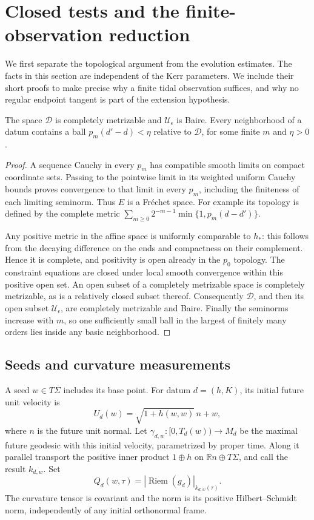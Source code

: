 \section{Closed tests and the finite-observation reduction}\label{sec:category}

We first separate the topological argument from the evolution estimates.
The facts in this section are independent of the Kerr parameters. We
include their short proofs to make precise why a finite tidal
observation suffices, and why no regular endpoint tangent is part of
the extension hypothesis.

\begin{lemma}\label{cat:baire}
The space \(\mathcal D\) is completely metrizable and
\(\mathcal U_\epsilon\) is Baire. Every neighborhood of a datum contains
a ball \(p_m(d'-d)<\eta\) relative to \(\mathcal D\), for some finite
\(m\) and \(\eta>0\).
\end{lemma}
\begin{proof}
A sequence Cauchy in every \(p_m\) has compatible smooth limits on
compact coordinate sets. Passing to the pointwise limit in its weighted
uniform Cauchy bounds proves convergence to that limit in every
\(p_m\), including the finiteness of each limiting seminorm. Thus
\(E\) is a Fr\'echet space. For example its topology is defined by
the complete metric
\(\sum_{m\geq0}2^{-m-1}\min\{1,p_m(d-d')\}\).

Any positive metric in the affine space is uniformly comparable to
\(h_*\): this follows from the decaying difference on the ends and
compactness on their complement. Hence it is complete, and positivity
is open already in the \(p_0\) topology. The constraint equations are
closed under local smooth convergence within this positive open set.
An open subset of a completely metrizable space is completely
metrizable, as is a relatively closed subset thereof. Consequently
\(\mathcal D\), and then its open subset \(\mathcal U_\epsilon\),
are completely metrizable and Baire. Finally the seminorms increase
with \(m\), so one sufficiently small ball in the largest of finitely
many orders lies inside any basic neighborhood.
\end{proof}

\subsection{Seeds and curvature measurements}

A seed \(w\in T\Sigma\) includes its base point. For datum
\(d=(h,K)\), its initial future unit velocity is
\[
 U_d(w)=\sqrt{1+h(w,w)}\,n+w,
\]
where \(n\) is the future unit normal. Let
\(\gamma_{d,w}:[0,T_d(w))\to M_d\) be the maximal future geodesic
with this initial velocity, parametrized by proper time. Along it
parallel transport the positive inner product \(1\oplus h\) on
\(\mathbb R n\oplus T\Sigma\), and call the result \(k_{d,w}\).
Set
\begin{equation}\label{cat:Q}
 Q_d(w,\tau)=|\operatorname{Riem}(g_d)|_{k_{d,w}(\tau)}.
\end{equation}
The curvature tensor is covariant and the norm is its positive
Hilbert--Schmidt norm, independently of any initial orthonormal frame.


